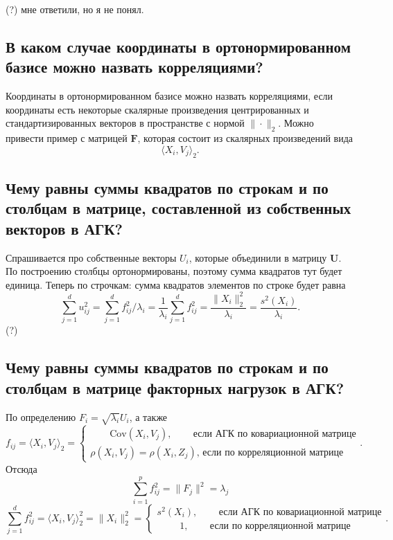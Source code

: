 \documentclass[12pt,a4paper,final]{article}
\begin{document}
(?) мне ответили, но я не понял.

\subsection{В каком случае координаты в ортонормированном базисе можно назвать корреляциями?}

Координаты в ортонормированном базисе можно назвать корреляциями, если координаты есть некоторые скалярные произведения центрированных и стандартизированных векторов в пространстве с нормой $\|\cdot\|_2$. Можно привести пример с матрицей $\bm F$, которая состоит из скалярных произведений вида 
$$
\langle X_i, V_j \rangle_2.
$$

\subsection{Чему равны суммы квадратов по строкам и по столбцам в матрице, составленной из собственных векторов в АГК?}

Спрашивается про собственные векторы $U_i$, которые объединили в матрицу $\bm U$. По построению столбцы ортонормированы, поэтому сумма квадратов тут будет единица. 
Теперь по строчкам: сумма квадратов элементов по строке будет равна 
$$
\sum_{j = 1}^d u_{ij}^2 = \sum_{j = 1}^d  f_{ij}^2/\lambda_i = \frac{1}{\lambda_i} \sum_{j = 1}^d  f_{ij}^2 = \frac{\|X_i\|^2_2}{\lambda_i} = \frac{s^2(X_i)}{\lambda_i}.
$$
(?)

\subsection{Чему равны суммы квадратов по строкам и по столбцам в матрице факторных нагрузок в АГК?}

По определению $F_i = \sqrt{\lambda_i} U_i$, а также
$$
f_{ij} = \langle X_i, V_j \rangle _2 = \begin{cases} \qquad \mathrm{Cov}(X_i, V_j),\,\qquad \textit{если АГК по ковариационной матрице} \\  \rho(X_i, V_j) = \rho(X_i, Z_j),\, \textit{если по корреляционной матрице} \end{cases}.
$$
Отсюда
$$
\sum_{i = 1}^p  f_{ij}^2 = \|F_j\|^2 = \lambda_j
$$
$$
\sum_{j = 1}^d  f_{ij}^2 = \langle X_i, V_j  \rangle_2^2 = \|X_i\|^2_2 = \begin{cases}  s^2(X_i),\,\qquad \textit{если АГК по ковариационной матрице} \\ \qquad\,\, 1,\,\qquad \textit{если по корреляционной матрице} \end{cases}.
$$
\end{document}

